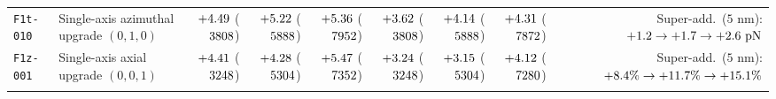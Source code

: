 \begin{table}[!htbp]
{\begin{tabular}{llrrrrrrr}
\texttt{F1t-010} & Single-axis azimuthal upgrade $(0,1,0)$ & $+\roundtwo{\NthreeMtFzeroonezeroThetaRfivenmToneFzPn}$ ($3808$) & $+\roundtwo{\NthreeMtFzeroonezeroThetaRfivenmTtwoFzPn}$ ($5888$) & $+\roundtwo{\NthreeMtFzeroonezeroThetaRfivenmTthreeFzPn}$ ($7952$) & $+\roundtwo{\NthreeMtFzeroonezeroThetaRonezeronmToneFzPn}$ ($3808$) & $+\roundtwo{\NthreeMtFzeroonezeroThetaRonezeronmTtwoFzPn}$ ($5888$) & $+\roundtwo{\NthreeMtFzeroonezeroThetaRonezeronmTthreeFzPn}$ ($7872$) & Super-add.\ ($5\text{ nm}$): $+\roundone{\NthreeMtSuperaddExcessRfivenmTonePn} \to +\roundone{\NthreeMtSuperaddExcessRfivenmTtwoPn} \to +\roundone{\NthreeMtSuperaddExcessRfivenmTthreePn}\text{ pN}$ \\
\texttt{F1z-001} & Single-axis axial upgrade $(0,0,1)$ & $+\roundtwo{\NthreeMtFzerozerooneZRfivenmToneFzPn}$ ($3248$) & $+\roundtwo{\NthreeMtFzerozerooneZRfivenmTtwoFzPn}$ ($5304$) & $+\roundtwo{\NthreeMtFzerozerooneZRfivenmTthreeFzPn}$ ($7352$) & $+\roundtwo{\NthreeMtFzerozerooneZRonezeronmToneFzPn}$ ($3248$) & $+\roundtwo{\NthreeMtFzerozerooneZRonezeronmTtwoFzPn}$ ($5304$) & $+\roundtwo{\NthreeMtFzerozerooneZRonezeronmTthreeFzPn}$ ($7280$) & Super-add.\ ($5\text{ nm}$): $+\roundone{\NthreeMtSuperaddExcessRfivenmTonePct}\% \to +\roundone{\NthreeMtSuperaddExcessRfivenmTtwoPct}\% \to +\roundone{\NthreeMtSuperaddExcessRfivenmTthreePct}\%$ \\
\botrule
\end{tabular}%
}
\smallskip

\end{table}
